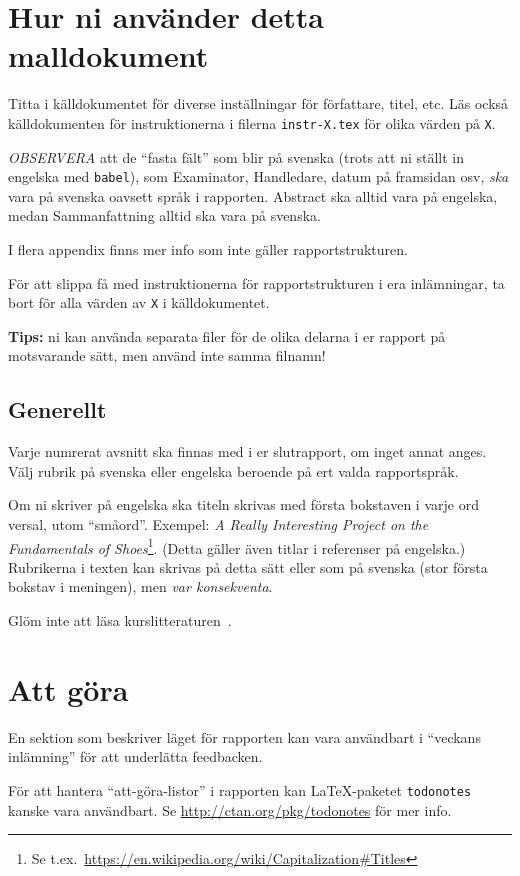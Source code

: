 \section*{Hur ni använder detta malldokument}
Titta i källdokumentet för diverse inställningar för författare, titel, etc. Läs också käll\-doku\-men\-ten för instruktionerna i filerna \verb|instr-X.tex| för olika värden på \verb|X|.

\emph{OBSERVERA} att de ``fasta fält'' som blir på svenska (trots att ni ställt in engelska med \texttt{babel}), som Examinator, Handledare, datum på framsidan osv, \emph{ska} vara på svenska oavsett språk i rapporten. Abstract ska alltid vara på engelska, medan Sammanfattning alltid ska vara på svenska.

I flera appendix finns mer info som inte gäller rapportstrukturen.

För att slippa få med instruktionerna för rapportstrukturen i era inlämningar, ta bort \verb|| för alla värden av \verb|X|
i källdokumentet.

\textbf{Tips:} ni kan använda separata filer för de olika delarna i er rapport på motsvarande sätt, men använd inte samma filnamn!

\subsection*{Generellt}
Varje numrerat avsnitt ska finnas med i er slutrapport, om inget annat anges.  
Välj rubrik på svenska eller engelska beroende på ert valda rapportspråk.

Om ni skriver på engelska ska titeln skrivas med första bokstaven i varje ord versal, utom ``småord''. Exempel: \emph{A Really Interesting Project on the Fundamentals of Shoes}\footnote{Se t.ex.~\url{https://en.wikipedia.org/wiki/Capitalization\#Titles}}.  (Detta gäller även titlar i referenser på engelska.)
Rubrikerna i texten kan skrivas på detta sätt eller som på svenska (stor första bokstav i meningen), men \emph{var konsekventa}.

Glöm inte att läsa kurslitteraturen~\cite{dawson:projects-in-computing,dawson:projects-in-computing-old}.




\section*{Att göra}
En sektion som beskriver läget för rapporten kan vara användbart i ``veckans inlämning'' för att underlätta feedbacken.

För att hantera ``att-göra-listor'' i rapporten kan La\TeX-paketet \verb|todonotes| kanske vara användbart. Se \url{http://ctan.org/pkg/todonotes} för mer info.


